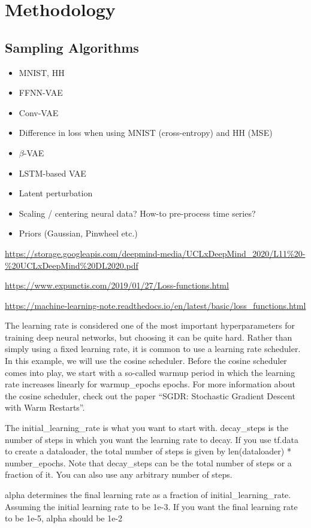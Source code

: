 \section{Methodology}\label{sec:Method}

\subsection{Sampling Algorithms}\label{sec:sampling_algos}

\begin{itemize}
    \item MNIST, HH
    \item FFNN-VAE
    \item Conv-VAE
    \item Difference in loss when using MNIST (cross-entropy) and HH (MSE)
    \item $\beta$-VAE
    \item LSTM-based VAE
    \item Latent perturbation
    \item Scaling / centering neural data? How-to pre-process time series?
    \item Priors (Gaussian, Pinwheel etc.)
\end{itemize}

\url{https://storage.googleapis.com/deepmind-media/UCLxDeepMind_2020/L11%20-%20UCLxDeepMind%20DL2020.pdf}

\url{https://www.expunctis.com/2019/01/27/Loss-functions.html}

\url{https://machine-learning-note.readthedocs.io/en/latest/basic/loss_functions.html}

The learning rate is considered one of the most important hyperparameters for training deep neural networks, but choosing it can be quite hard. Rather than simply using a fixed learning rate, it is common to use a learning rate scheduler. In this example, we will use the cosine scheduler. Before the cosine scheduler comes into play, we start with a so-called warmup period in which the learning rate increases linearly for warmup\_epochs epochs. For more information about the cosine scheduler, check out the paper “SGDR: Stochastic Gradient Descent with Warm Restarts”.

The initial\_learning\_rate is what you want to start with.
decay\_steps is the number of steps in which you want the learning rate to decay. If you use tf.data to create a dataloader, the total number of steps is given by len(dataloader) * number\_epochs. Note that decay\_steps can be the total number of steps or a fraction of it. You can also use any arbitrary number of steps.

alpha determines the final learning rate as a fraction of initial\_learning\_rate. Assuming the initial learning rate to be 1e-3. If you want the final learning rate to be 1e-5, alpha should be 1e-2

